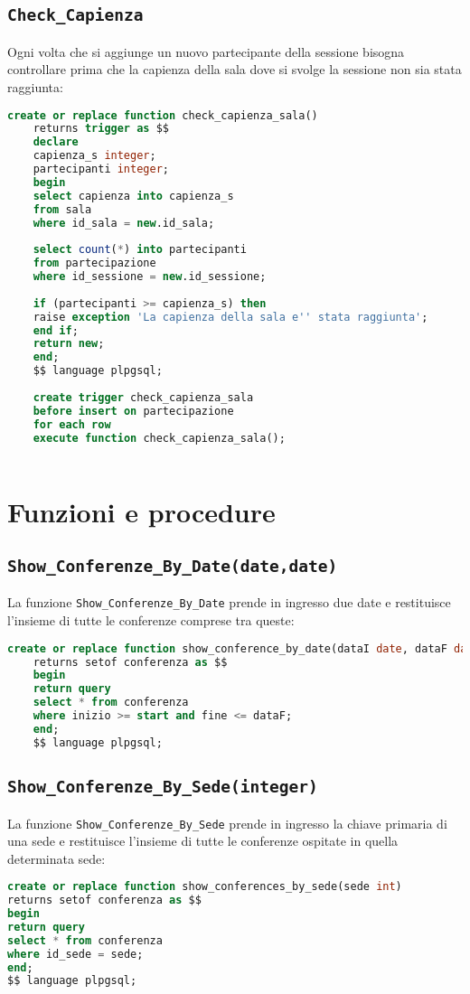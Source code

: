 \subsection{\texttt{Check\_Capienza}}
Ogni volta che si aggiunge un nuovo partecipante della sessione bisogna controllare prima che la capienza della sala dove si svolge la sessione non sia stata raggiunta:
\begin{lstlisting}[language=SQL, style=mystyle]
	create or replace function check_capienza_sala() 
	returns trigger as $$
	declare
	capienza_s integer;
	partecipanti integer;
	begin
	select capienza into capienza_s
	from sala
	where id_sala = new.id_sala;
	
	select count(*) into partecipanti
	from partecipazione
	where id_sessione = new.id_sessione;
	
	if (partecipanti >= capienza_s) then
	raise exception 'La capienza della sala e'' stata raggiunta';
	end if;
	return new;
	end;
	$$ language plpgsql;
	
	create trigger check_capienza_sala
	before insert on partecipazione
	for each row
	execute function check_capienza_sala();
	
\end{lstlisting}
\section{Funzioni e procedure}
\subsection{\texttt{Show\_Conferenze\_By\_Date(date,date)}}
La funzione \texttt{Show\_Conferenze\_By\_Date} prende in ingresso due date e restituisce l'insieme di tutte le conferenze comprese tra queste:
\begin{lstlisting}[language=SQL, style=mystyle]
	create or replace function show_conference_by_date(dataI date, dataF date)
	returns setof conferenza as $$
	begin
	return query
	select * from conferenza
	where inizio >= start and fine <= dataF;
	end;
	$$ language plpgsql;
\end{lstlisting}
\subsection{\texttt{Show\_Conferenze\_By\_Sede(integer)}}
La funzione \texttt{Show\_Conferenze\_By\_Sede} prende in ingresso la chiave primaria di una sede e restituisce l'insieme di tutte le conferenze ospitate in quella determinata sede:
\begin{lstlisting}[language=SQL, style=mystyle]
create or replace function show_conferences_by_sede(sede int)
returns setof conferenza as $$
begin
return query
select * from conferenza
where id_sede = sede;
end;
$$ language plpgsql;
\end{lstlisting}
